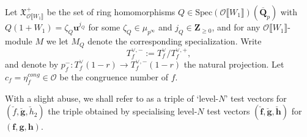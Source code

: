 \documentclass[10pt,letterpaper]{amsart}
\theoremstyle{plain}
\theoremstyle{definition}
\theoremstyle{definition}
\theoremstyle{plain}
\theoremstyle{plain}
\theoremstyle{plain}
\theoremstyle{remark}
\numberwithin{equation}{section}
\newcommand{\cc}{\mathbf{c}}
\newcommand{\ch}{\xi}
\newcommand{\rH}{H}
\newcommand{\pp}{\mathfrak{p}}
\def\cO{\mathcal O}
\newcommand{\Q}{\mathbf{Q}}
\newcommand{\Z}{\mathbf{Z}}
\newcommand{\dBr}[1]{\llbracket{#1}\rrbracket}
\newcommand{\bff}{{\boldsymbol{f}}}
\newcommand{\bfg}{{\boldsymbol{g}}}
\newcommand{\bfh}{{\boldsymbol{h}}}
\begin{document}
Let  $\mathfrak{X}_{\cO\dBr{W_1}}^+$ be the set of ring homomorphisms $Q\in{\mathrm{Spec}}(\cO\dBr{W_1})(\overline{\Q}_p)$ with $Q(1+W_1)=\zeta_Q\mathbf{u}^{j_Q}$ for some $\zeta_Q\in\mu_{p^\infty}$ and $j_Q\in\Z_{\geq 0}$, and for any $\cO\dBr{W_1}$-module $M$ we let $M_Q$ denote the corresponding  specialization. Write 
\[
T_f^{\vee,-}:=T_f^\vee/T_f^{\vee,+},
\]
%
and denote by $p_f^-:T_f^{\vee}(1-r)\rightarrow T_f^{\vee,-}(1-r)$ the natural projection. Let $c_f=\eta_f^{cong}\in\mathcal{O}$ be the congruence number of $f$. %

With a slight abuse, we shall refer to as a triple of `level-$N$' test vectors for $(\breve{f},\breve{\bfg},\breve{h}_2)$ the triple obtained by specialising level-$N$ test vectors $(\breve{\boldsymbol{\bff}},\breve{\boldsymbol{\bfg}},\breve{\boldsymbol{\bfh}})$ for $(\boldsymbol{\bff},\boldsymbol{\bfg},\boldsymbol{\bfh})$.
\end{document}
